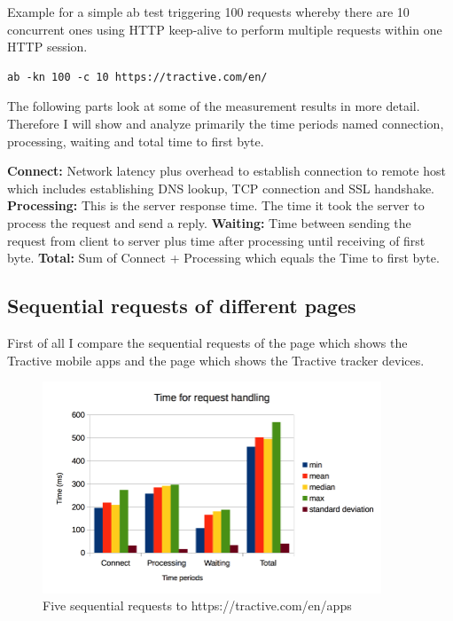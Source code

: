 Example for a simple ab test triggering 100 requests whereby there are 10 concurrent ones using HTTP keep-alive to perform multiple requests within one HTTP session.
\begin{lstlisting}
ab -kn 100 -c 10 https://tractive.com/en/
\end{lstlisting}

The following parts look at some of the measurement results in more detail.
Therefore I will show and analyze primarily the time periods named connection, processing, waiting and total time to first byte.

\textbf{Connect:} Network latency plus overhead to establish connection to remote host which includes establishing DNS lookup, TCP connection and SSL handshake.
\textbf{Processing:} This is the server response time. The time it took the server to process the request and send a reply.
\textbf{Waiting:} Time between sending the request from client to server plus time after processing until receiving of first byte.
\textbf{Total:} Sum of Connect + Processing which equals the Time to first byte.

\subsection{Sequential requests of different pages}
First of all I compare the sequential requests of the page which shows the Tractive mobile apps and the page which shows the Tractive tracker devices.

\begin{figure}[h!]
	\centering
		\includegraphics[width=0.9\textwidth]{imgs/seq_req_apps.png}
	\caption{Five sequential requests to https://tractive.com/en/apps}
\end{figure}

